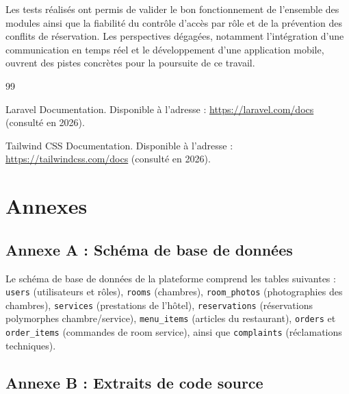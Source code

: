 \documentclass[12pt,a4paper]{report}
\begin{document}
Les tests réalisés ont permis de valider le bon fonctionnement de
l'ensemble des modules ainsi que la fiabilité du contrôle d'accès par
rôle et de la prévention des conflits de réservation. Les perspectives
dégagées, notamment l'intégration d'une communication en temps réel et le
développement d'une application mobile, ouvrent des pistes concrètes pour
la poursuite de ce travail.

\begin{thebibliography}{99}

     Laravel Documentation. Disponible à l'adresse :
    \url{https://laravel.com/docs} (consulté en 2026).

     Tailwind CSS Documentation. Disponible à l'adresse :
    \url{https://tailwindcss.com/docs} (consulté en 2026).

\end{thebibliography}

\appendix
\chapter*{Annexes}

\section*{Annexe A : Schéma de base de données}

Le schéma de base de données de la plateforme comprend les tables
suivantes : \texttt{users} (utilisateurs et rôles), \texttt{rooms}
(chambres), \texttt{room\_photos} (photographies des chambres),
\texttt{services} (prestations de l'hôtel), \texttt{reservations}
(réservations polymorphes chambre/service), \texttt{menu\_items} (articles
du restaurant), \texttt{orders} et \texttt{order\_items} (commandes de
room service), ainsi que \texttt{complaints} (réclamations techniques).

\section*{Annexe B : Extraits de code source}
\end{document}
